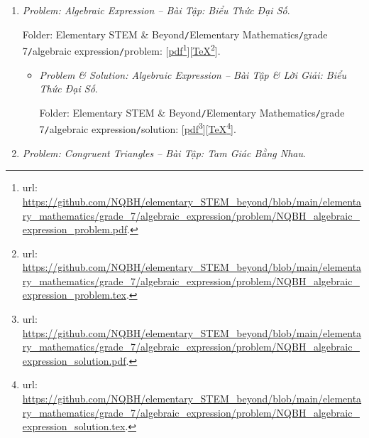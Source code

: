 \documentclass[12pt]{article}
\begin{document}
\begin{enumerate}
\begin{itemize}
		Folder: {\sf Elementary STEM \& Beyond{\tt/}Elementary Mathematics{\tt/}grade 7{\tt/}probability \& statistics{\tt/}solution}: [\href{https://github.com/NQBH/elementary_STEM_beyond/blob/main/elementary_mathematics/grade_7/probability_statistics/solution/NQBH_probability_statistics_solution.pdf}{pdf}\footnote{{\sc url}: \url{https://github.com/NQBH/elementary_STEM_beyond/blob/main/elementary_mathematics/grade_7/probability_statistics/solution/NQBH_probability_statistics_solution.pdf}.}][\href{https://github.com/NQBH/elementary_STEM_beyond/blob/main/elementary_mathematics/grade_7/probability_statistics/solution/NQBH_probability_statistics_solution.tex}{\TeX}\footnote{{\sc url}: \url{https://github.com/NQBH/elementary_STEM_beyond/blob/main/elementary_mathematics/grade_7/probability_statistics/solution/NQBH_probability_statistics_solution.tex}.}].
	\end{itemize}	
	
	\item {\it Problem: Algebraic Expression -- Bài Tập: Biểu Thức Đại Số}.
	
	Folder: {\sf Elementary STEM \& Beyond{\tt/}Elementary Mathematics{\tt/}grade 7{\tt/}algebraic expression{\tt/}problem}: [\href{https://github.com/NQBH/elementary_STEM_beyond/blob/main/elementary_mathematics/grade_7/algebraic_expression/problem/NQBH_algebraic_expression_problem.pdf}{pdf}\footnote{{\sc url}: \url{https://github.com/NQBH/elementary_STEM_beyond/blob/main/elementary_mathematics/grade_7/algebraic_expression/problem/NQBH_algebraic_expression_problem.pdf}.}][\href{https://github.com/NQBH/elementary_STEM_beyond/blob/main/elementary_mathematics/grade_7/algebraic_expression/problem/NQBH_algebraic_expression_problem.tex}{\TeX}\footnote{{\sc url}: \url{https://github.com/NQBH/elementary_STEM_beyond/blob/main/elementary_mathematics/grade_7/algebraic_expression/problem/NQBH_algebraic_expression_problem.tex}.}].
	\begin{itemize}
		\item {\it Problem \& Solution: Algebraic Expression -- Bài Tập \& Lời Giải: Biểu Thức Đại Số}.
		
		Folder: {\sf Elementary STEM \& Beyond{\tt/}Elementary Mathematics{\tt/}grade 7{\tt/}algebraic expression{\tt/}solution}: [\href{https://github.com/NQBH/elementary_STEM_beyond/blob/main/elementary_mathematics/grade_7/algebraic_expression/problem/NQBH_algebraic_expression_solution.pdf}{pdf}\footnote{{\sc url}: \url{https://github.com/NQBH/elementary_STEM_beyond/blob/main/elementary_mathematics/grade_7/algebraic_expression/problem/NQBH_algebraic_expression_solution.pdf}.}][\href{https://github.com/NQBH/elementary_STEM_beyond/blob/main/elementary_mathematics/grade_7/algebraic_expression/problem/NQBH_algebraic_expression_solution.tex}{\TeX}\footnote{{\sc url}: \url{https://github.com/NQBH/elementary_STEM_beyond/blob/main/elementary_mathematics/grade_7/algebraic_expression/problem/NQBH_algebraic_expression_solution.tex}.}].
	\end{itemize}
	\item {\it Problem: Congruent Triangles -- Bài Tập: Tam Giác Bằng Nhau}.
	

\end{enumerate}
\end{document}
